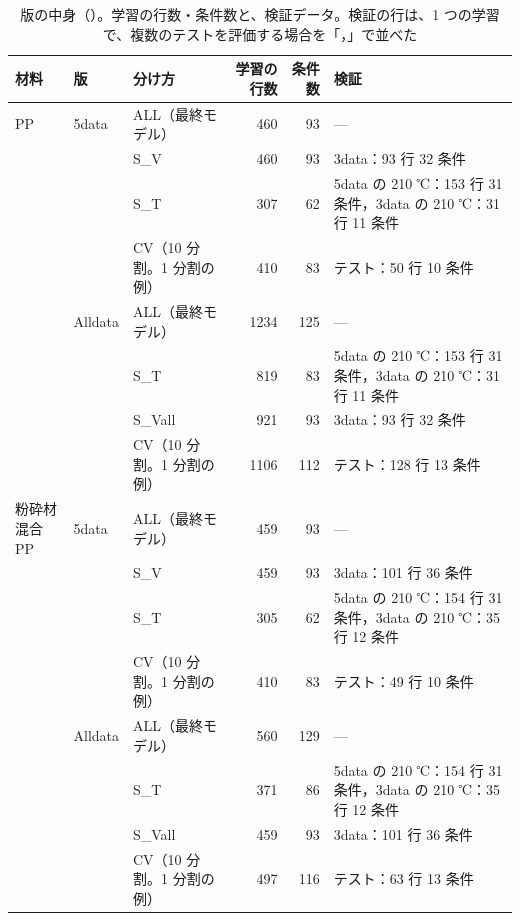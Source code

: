 \documentclass[paper=a4paper,fontsize=10.5pt,line_length=44zw,number_of_lines=38]{jlreq}
\newcommand{\file}[1]{\texttt{\detokenize{#1}}}
\begin{document}
\begin{table}[H]
\caption{版の中身（\file{versions.csv}）。学習の行数・条件数と、検証データ。検証の行は、1 つの学習で、複数のテストを評価する場合を「，」で並べた}\label{tab:versions}
\begin{tabularx}{\linewidth}{@{}l>{\raggedright\arraybackslash}p{4\zw}>{\raggedright\arraybackslash}p{9\zw}rrX@{}}
\toprule
材料 & 版 & 分け方 & 学習の行数 & 条件数 & 検証 \\
\midrule
PP & 5data & ALL（最終モデル） & 460 & 93 & --- \\
 &  & S\_V & 460 & 93 & 3data：93 行 32 条件 \\
 &  & S\_T & 307 & 62 & 5data の 210 ℃：153 行 31 条件，3data の 210 ℃：31 行 11 条件 \\
 &  & CV（10 分割。1 分割の例） & 410 & 83 & テスト：50 行 10 条件 \\
 & Alldata & ALL（最終モデル） & 1234 & 125 & --- \\
 &  & S\_T & 819 & 83 & 5data の 210 ℃：153 行 31 条件，3data の 210 ℃：31 行 11 条件 \\
 &  & S\_Vall & 921 & 93 & 3data：93 行 32 条件 \\
 &  & CV（10 分割。1 分割の例） & 1106 & 112 & テスト：128 行 13 条件 \\
粉砕材混合 PP & 5data & ALL（最終モデル） & 459 & 93 & --- \\
 &  & S\_V & 459 & 93 & 3data：101 行 36 条件 \\
 &  & S\_T & 305 & 62 & 5data の 210 ℃：154 行 31 条件，3data の 210 ℃：35 行 12 条件 \\
 &  & CV（10 分割。1 分割の例） & 410 & 83 & テスト：49 行 10 条件 \\
 & Alldata & ALL（最終モデル） & 560 & 129 & --- \\
 &  & S\_T & 371 & 86 & 5data の 210 ℃：154 行 31 条件，3data の 210 ℃：35 行 12 条件 \\
 &  & S\_Vall & 459 & 93 & 3data：101 行 36 条件 \\
 &  & CV（10 分割。1 分割の例） & 497 & 116 & テスト：63 行 13 条件 \\
\bottomrule
\end{tabularx}
\end{table}
\end{document}
